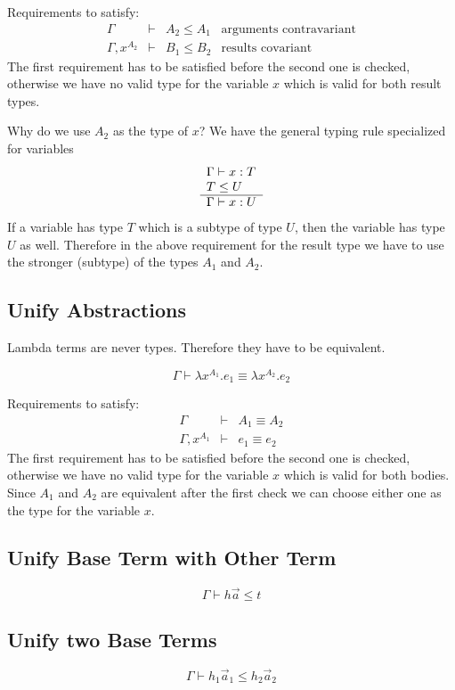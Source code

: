 Requirements to satisfy:
$$
\begin{array}{llll}
    \Gamma &\vdash&
    A_2 \le A_1
    &\text{arguments contravariant}
    \\
    \Gamma, x^{A_2} &\vdash&
    B_1 \le B_2
    &\text{results covariant}
\end{array}
$$
The first requirement has to be satisfied before the second one is checked,
otherwise we have no valid type for the variable $x$ which is valid for both
result types.

Why do we use $A_2$ as the type of $x$? We have the general typing rule
specialized for variables
$$
    \begin{array}{l} 
        \Gamma \vdash x : T
        \\
        T \le U
     \\ \hline 
        \Gamma \vdash x: U
     \end{array}
$$
If a variable has type $T$ which is a subtype of type $U$, then the variable has
type $U$ as well. Therefore in the above requirement for the result type we have
to use the stronger (subtype) of the types $A_1$ and $A_2$.






\subsection{Unify Abstractions}

Lambda terms are never types. Therefore they have to be equivalent.

$$
    \Gamma \vdash \lambda x^{A_1}. e_1 \equiv \lambda x^{A_2}. e_2
$$

Requirements to satisfy:
$$
\begin{array}{lll}
    \Gamma &\vdash&
    A_1 \equiv A_2
    \\
    \Gamma, x^{A_1} &\vdash&
    e_1 \equiv e_2
\end{array}
$$
The first requirement has to be satisfied before the second one is checked,
otherwise we have no valid type for the variable $x$ which is valid for both
bodies. Since $A_1$ and $A_2$ are equivalent after the first check we can choose
either one as the type for the variable $x$.






\subsection{Unify Base Term with Other Term}


$$
    \Gamma \vdash h \vec a \le t
$$




\subsection{Unify two Base Terms}


$$
    \Gamma \vdash h_1 \vec a_1 \le h_2 \vec a_2
$$
